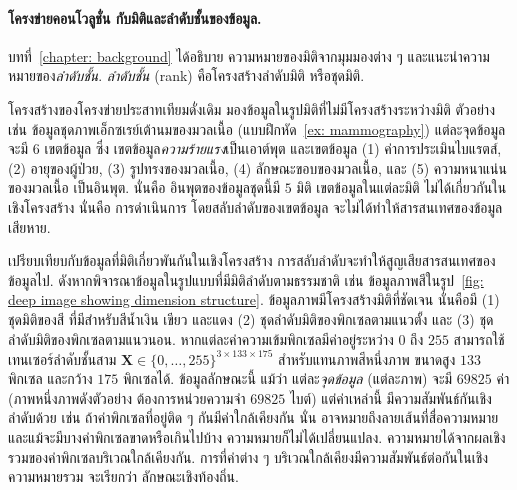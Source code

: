 \paragraph{โครงข่ายคอนโวลูชั่น กับมิติและลำดับชั้นของข้อมูล.}

บทที่~\ref{chapter: background}
ได้อธิบาย
ความหมายของมิติจากมุมมองต่าง ๆ
และแนะนำความหมายของ\textit{ลำดับชั้น}.
\textit{ลำดับชั้น} (rank) คือโครงสร้างลำดับมิติ หรือชุดมิติ.

โครงสร้างของโครงข่ายประสาทเทียมดั่งเดิม
มองข้อมูลในรูปมิติที่ไม่มีโครงสร้างระหว่างมิติ
ตัวอย่างเช่น 
ข้อมูลชุดภาพเอ็กซเรย์เต้านมของมวลเนื้อ (แบบฝึกหัด~\ref{ex: mammography})
แต่ละจุดข้อมูลจะมี $6$ เขตข้อมูล ซึ่ง เขตข้อมูล\textit{ความร้ายแรง}เป็นเอาต์พุต 
และเขตข้อมูล (1) ค่าการประเมินไบแรตส์, (2) อายุของผู้ป่วย, (3) รูปทรงของมวลเนื้อ, (4) ลักษณะขอบของมวลเนื้อ, และ (5) ความหนาแน่นของมวลเนื้อ เป็นอินพุต.
นั่นคือ อินพุตของข้อมูลชุดนี้มี $5$ มิติ
เขตข้อมูลในแต่ละมิติ ไม่ได้เกี่ยวกันในเชิงโครงสร้าง
นั่นคือ การดำเนินการ โดยสลับลำดับของเขตข้อมูล
จะไม่ได้ทำให้สารสนเทศของข้อมูลเสียหาย.

เปรียบเทียบกับข้อมูลที่มิติเกี่ยวพันกันในเชิงโครงสร้าง
การสลับลำดับจะทำให้สูญเสียสารสนเทศของข้อมูลไป.
ดังหากพิจารณาข้อมูลในรูปแบบที่มีมิติลำดับตามธรรมชาติ เช่น 
ข้อมูลภาพสีในรูป~\ref{fig: deep image showing dimension structure}.
ข้อมูลภาพมีโครงสร้างมิติที่ชัดเจน นั่นคือมี (1) ชุดมิติของสี ที่มีสำหรับสีน้ำเงิน เขียว และแดง
(2) ชุดลำดับมิติของพิกเซลตามแนวตั้ง และ (3) ชุดลำดับมิติของพิกเซลตามแนวนอน.
หากแต่ละค่าความเข้มพิกเซลมีค่าอยู่ระหว่าง $0$ ถึง $255$
สามารถใช้ 
เทนเซอร์ลำดับชั้นสาม $\bm{X} \in \{0, \ldots, 255\}^{3 \times 133 \times 175}$ สำหรับแทนภาพสีหนึ่งภาพ
ขนาดสูง $133$ พิกเซล และกว้าง $175$ พิกเซลได้.
%
ข้อมูลลักษณะนี้ แม้ว่า แต่ละ\textit{จุดข้อมูล} (แต่ละภาพ) จะมี $69825$ ค่า (ภาพหนึ่งภาพดังตัวอย่าง ต้องการหน่วยความจำ $69825$ ไบต์) 
แต่ค่าเหล่านี้
มีความสัมพันธ์กันเชิงลำดับด้วย เช่น ถ้าค่าพิกเซลที่อยู่ติด ๆ กันมีค่าใกล้เคียงกัน 
นั่น อาจหมายถึงลายเส้นที่สื่อความหมาย
และแม้จะมีบางค่าพิกเซลขาดหรือเกินไปบ้าง ความหมายก็ไม่ได้เปลี่ยนแปลง.
ความหมายได้จากผลเชิงรวมของค่าพิกเซลบริเวณใกล้เคียงกัน.
การที่ค่าต่าง ๆ บริเวณใกล้เคียงมีความสัมพันธ์ต่อกันในเชิงความหมายรวม จะเรียกว่า ลักษณะเชิงท้องถิ่น.

